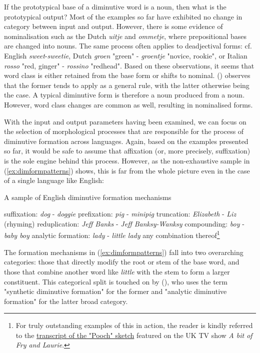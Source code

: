 If the prototypical base of a diminutive word is a noun, then what is the prototypical output? Most of the examples so far have exhibited no change in category between input and output. However, there is some evidence of nominalisation such as the Dutch \textit{uitje} and \textit{ommetje}, where prepositional bases are changed into nouns. The same process often applies to deadjectival forms: cf. English \textit{sweet}-\textit{sweetie}, Dutch \textit{groen} "green" - \textit{groentje} "novice, rookie", or Italian \textit{rosso} "red, ginger" - \textit{rossino} "redhead". Based on these observations, it seems that word class is either retained from the base form or shifts to nominal. \citeauthor{Schneider+2003} (\citeyear{Schneider+2003}) observes that the former tends to apply as a general rule, with the latter otherwise being the case. A typical diminutive form is therefore a noun produced from a noun. However, word class changes are common as well, resulting in nominalised forms.

With the input and output parameters having been examined, we can focus on the selection of morphological processes that are responsible for the process of diminutive formation across languages. Again, based on the examples presented so far, it would be safe to assume that affixation (or, more precisely, suffixation) is the sole engine behind this process. However, as the non-exhaustive sample in (\ref{ex:dimformpatterns}) shows, this is far from the whole picture even in the case of a single language like English:

\begin{exe}
\ex \label{ex:dimformpatterns}
A sample of English diminutive formation mechanisms 
\begin{xlist}
    \ex suffixation: \textit{dog} - \textit{doggie}
    \ex prefixation: \textit{pig} - \textit{minipig}
    \ex truncation: \textit{Elizabeth} - \textit{Liz}
    \ex (rhyming) reduplication: \textit{Jeff Banks} - \textit{Jeff Banksy-Wanksy}
    \ex compounding: \textit{boy} - \textit{baby boy}
    \ex analytic formation: \textit{lady} - \textit{little lady}
    \ex any combination thereof\footnote{For truly outstanding examples of this in action, the reader is kindly referred to the \href{https://abitoffryandlaurie.co.uk/sketches/pooch}{transcript of the "Pooch" sketch} featured on the UK TV show \textit{A bit of Fry and Laurie}.}
\end{xlist}
\end{exe}

 The formation mechanisms in (\ref{ex:dimformpatterns}) fall into two overarching categories: those that directly modify the root or stem of the base word, and those that combine another word like \textit{little} with the stem to form a larger constituent. This categorical split is touched on by \citeauthor{Schneider+2003} (\citeyear{Schneider+2003}), who uses the term "synthetic diminutive formation" for the former and "analytic diminutive formation" for the latter broad category. 

